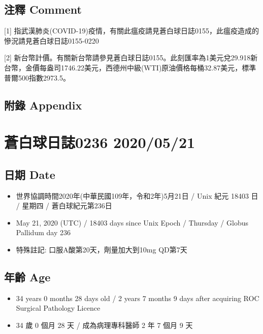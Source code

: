 \documentclass[a5paper, 12pt
]{book}
\providecommand{\tightlist}{%
  \setlength{\itemsep}{0pt}\setlength{\parskip}{0pt}}
\begin{document}
\hypertarget{ux6ce8ux91cb-comment-80}{%
\subsection{注釋 Comment}\label{ux6ce8ux91cb-comment-80}}

{[}1{]}
指武漢肺炎(COVID-19)疫情，有關此瘟疫請見蒼白球日誌0155，此瘟疫造成的慘況請見蒼白球日誌0155-0220

{[}2{]}
新台幣計價。有關新台幣請參見蒼白球日誌0155。此刻匯率為1美元兌29.918新台幣，金價每盎司1746.22美元，西德州中級(WTI)原油價格每桶32.87美元，標準普爾500指數2973.5。

\hypertarget{ux9644ux9304-appendix-80}{%
\subsection{附錄 Appendix}\label{ux9644ux9304-appendix-80}}

\hypertarget{ux84bcux767dux7403ux65e5ux8a8c0236-20200521}{%
\section{蒼白球日誌0236
2020/05/21}\label{ux84bcux767dux7403ux65e5ux8a8c0236-20200521}}

\hypertarget{ux65e5ux671f-date-81}{%
\subsection{日期 Date}\label{ux65e5ux671f-date-81}}

\begin{itemize}
\tightlist
\item
  世界協調時間2020年(中華民國109年，令和2年)5月21日 / Unix 紀元 18403 日
  / 星期四 / 蒼白球紀元第236日
\item
  May 21, 2020 (UTC) / 18403 days since Unix Epoch / Thursday / Globus
  Pallidum day 236
\item
  特殊註記: 口服A酸第20天，劑量加大到10mg QD第7天
\end{itemize}

\hypertarget{ux5e74ux9f61-age-81}{%
\subsection{年齡 Age}\label{ux5e74ux9f61-age-81}}

\begin{itemize}
\tightlist
\item
  34 years 0 months 28 days old / 2 years 7 months 9 days after
  acquiring ROC Surgical Pathology Licence
\item
  34 歲 0 個月 28 天 / 成為病理專科醫師 2 年 7 個月 9 天
\end{itemize}
\end{document}
